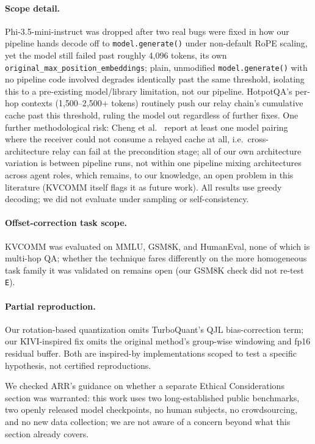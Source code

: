 \documentclass[11pt]{article}
\begin{document}
\paragraph{Scope detail.} Phi-3.5-mini-instruct was dropped after two
real bugs were fixed in how our pipeline hands decode off to
\texttt{model.generate()} under non-default RoPE scaling, yet the model
still failed past roughly 4{,}096 tokens, its own
\texttt{original\_max\_position\_embeddings}; plain, unmodified
\texttt{model.generate()} with no pipeline code involved degrades
identically past the same threshold, isolating this to a pre-existing
model/library limitation, not our pipeline. HotpotQA's per-hop contexts
(1{,}500--2{,}500+ tokens) routinely push our relay chain's cumulative
cache past this threshold, ruling the model out regardless of further
fixes. One further methodological risk: Cheng et al.\
\citep{latentcommpay2026} report at least one model pairing where the
receiver could not consume a relayed cache at all, i.e.\
cross-architecture relay can fail at the precondition stage; all of our
own architecture variation is between pipeline runs, not within one
pipeline mixing architectures across agent roles, which remains, to our
knowledge, an open problem in this literature (KVCOMM itself flags it as
future work). All results use greedy decoding; we did not evaluate
under sampling or self-consistency.

\paragraph{Offset-correction task scope.} KVCOMM was evaluated on MMLU,
GSM8K, and HumanEval, none of which is multi-hop QA; whether the
technique fares differently on the more homogeneous task family it was
validated on remains open (our GSM8K check did not re-test \texttt{E}).

\paragraph{Partial reproduction.} Our rotation-based quantization omits
TurboQuant's QJL bias-correction term; our KIVI-inspired fix omits the
original method's group-wise windowing and fp16 residual buffer. Both
are inspired-by implementations scoped to test a specific hypothesis,
not certified reproductions.

We checked ARR's guidance on whether a separate Ethical Considerations
section was warranted: this work uses two long-established public
benchmarks, two openly released model checkpoints, no human subjects,
no crowdsourcing, and no new data collection; we are not aware of a
concern beyond what this section already covers.
\end{document}
